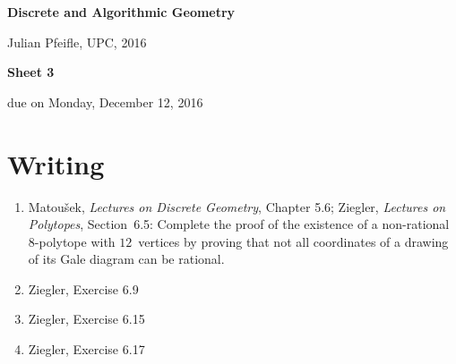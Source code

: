 \documentclass[11pt]{amsart}
\begin{document}
\begin{center}
\textbf{\sffamily
   Discrete and Algorithmic Geometry }

\medskip
   Julian Pfeifle,
   UPC, 2016
\end{center}

\bigskip

\begin{center}
  \textbf{\sffamily Sheet 3}

\bigskip
 due on Monday, December 12, 2016

\end{center}

\bigskip
\bigskip
\bigskip

\section*{Writing}

\begin{enumerate}
\item Matou\v sek, \emph{Lectures on Discrete Geometry}, Chapter 5.6; Ziegler, \emph{Lectures on Polytopes}, Section~6.5: Complete the proof of the existence of a non-rational $8$-polytope with $12$~vertices by proving that not all coordinates of a drawing of its Gale diagram can be rational.

\item Ziegler, Exercise 6.9

\item Ziegler, Exercise 6.15

\item Ziegler, Exercise 6.17
\end{enumerate}
\end{document}

